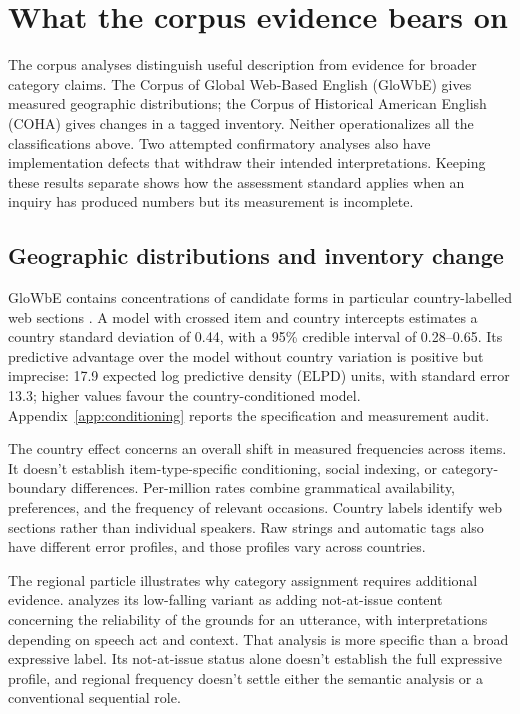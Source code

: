 \documentclass[12pt]{article}
\begin{document}
\section{What the corpus evidence bears on}\label{sec:evidence}

The corpus analyses distinguish useful description from evidence for
broader category claims. The Corpus of Global Web-Based English (GloWbE) gives measured geographic
distributions; the Corpus of Historical American English (COHA) gives
changes in a tagged inventory. Neither operationalizes all
the classifications above. Two attempted confirmatory analyses also
have implementation defects that withdraw their intended interpretations.
Keeping these results separate shows how the assessment standard applies
when an inquiry has produced numbers but its measurement is incomplete.

\subsection{Geographic distributions and inventory change}

GloWbE contains concentrations of candidate forms in particular
country-labelled web sections \citep{daviesfuchs2015}. A model with
crossed item and country intercepts estimates a country standard
deviation of 0.44, with a 95\% credible interval of 0.28--0.65.
Its predictive advantage over the model without country variation
is positive but imprecise: 17.9 expected log predictive density
(ELPD) units, with standard error 13.3; higher values favour the
country-conditioned model. Appendix~\ref{app:conditioning}
reports the specification and measurement audit.

The country effect concerns an overall shift in measured frequencies
across items. It doesn't establish item-type-specific conditioning,
social indexing, or category-boundary differences. Per-million rates
combine grammatical availability, preferences, and the frequency of
relevant occasions. Country labels identify web sections rather
than individual speakers. Raw strings and automatic tags also have
different error profiles, and those profiles vary across countries.

The regional particle  illustrates why category assignment
requires additional evidence. \textcite{lee2022lah} analyzes its low-falling variant
as adding not-at-issue content concerning the reliability of the
grounds for an utterance, with interpretations depending on speech
act and context. That analysis is more specific
than a broad expressive label. Its not-at-issue status alone doesn't
establish the full expressive profile, and regional frequency doesn't
settle either the semantic analysis or a conventional sequential role.
\end{document}

